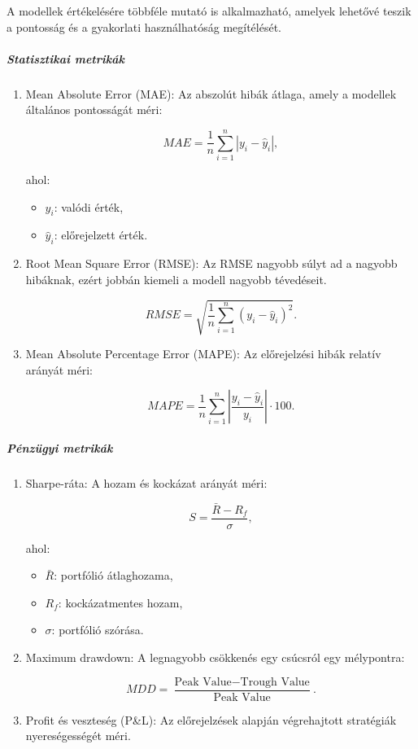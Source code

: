 \documentclass[11pt]{article}
\providecommand{\tightlist}{%
      \setlength{\itemsep}{0pt}\setlength{\parskip}{0pt}}
\begin{document}
A modellek értékelésére többféle mutató is alkalmazható, amelyek
lehetővé teszik a pontosság és a gyakorlati használhatóság megítélését.

\subparagraph{Statisztikai metrikák}\label{statisztikai-metrikuxe1k}

\begin{enumerate}
\def\labelenumi{\arabic{enumi}.}
\item
  Mean Absolute Error (MAE): Az abszolút hibák átlaga, amely a modellek
  általános pontosságát méri:

  \[MAE = \frac{1}{n} \sum_{i=1}^n |y_i - \hat{y}_i|,\]

  ahol:

  \begin{itemize}
  \tightlist
  \item
    \(y_i\): valódi érték,
  \item
    \(\hat{y}_i\): előrejelzett érték.
  \end{itemize}
\item
  Root Mean Square Error (RMSE): Az RMSE nagyobb súlyt ad a nagyobb
  hibáknak, ezért jobbán kiemeli a modell nagyobb tévedéseit.

  \[RMSE = \sqrt{\frac{1}{n} \sum_{i=1}^n (y_i - \hat{y}_i)^2}.\]
\item
  Mean Absolute Percentage Error (MAPE): Az előrejelzési hibák relatív
  arányát méri:

  \[MAPE = \frac{1}{n} \sum_{i=1}^n \left|\frac{y_i - \hat{y}_i}{y_i}\right| \cdot 100.\]
\end{enumerate}

\subparagraph{Pénzügyi metrikák}\label{puxe9nzuxfcgyi-metrikuxe1k}

\begin{enumerate}
\def\labelenumi{\arabic{enumi}.}
\item
  Sharpe-ráta: A hozam és kockázat arányát méri:

  \[S = \frac{\bar{R} - R_f}{\sigma},\]

  ahol:

  \begin{itemize}
  \tightlist
  \item
    \(\bar{R}\): portfólió átlaghozama,
  \item
    \(R_f\): kockázatmentes hozam,
  \item
    \(\sigma\): portfólió szórása.
  \end{itemize}
\item
  Maximum drawdown: A legnagyobb csökkenés egy csúcsról egy mélypontra:

  \[MDD = \frac{\text{Peak Value} - \text{Trough Value}}{\text{Peak Value}}.\]
\item
  Profit és veszteség (P\&L): Az előrejelzések alapján végrehajtott
  stratégiák nyereségességét méri.
\end{enumerate}
\end{document}
